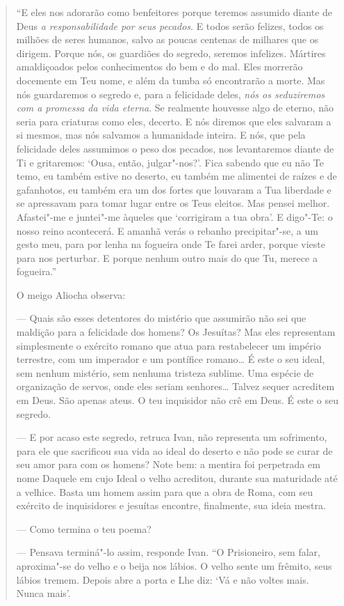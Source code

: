 \begin{quote}
``E eles nos adorarão como benfeitores porque teremos assumido diante de
Deus \emph{a responsabilidade por seus pecados}. E todos serão
felizes, todos os milhões de seres humanos, salvo as poucas centenas de
milhares que os dirigem. Porque nós, os guardiões do segredo, seremos
infelizes. Mártires amaldiçoados pelos conhecimentos do bem e do mal.
Eles morrerão docemente em Teu nome, e além da tumba só encontrarão a
morte. Mas nós guardaremos o segredo e, para a felicidade deles,
\emph{nós os seduziremos com a promessa da vida eterna}. Se realmente
houvesse algo de eterno, não seria para criaturas como eles, decerto. E
nós diremos que eles salvaram a si mesmos, mas nós salvamos a humanidade
inteira. E nós, que pela felicidade deles assumimos o peso dos pecados,
nos levantaremos diante de Ti e gritaremos: `Ousa, então,
julgar"-nos?'. Fica sabendo que eu não Te temo, eu também estive no
deserto, eu também me alimentei de raízes e de gafanhotos, eu também era
um dos fortes que louvaram a Tua liberdade e se apressavam para tomar
lugar entre os Teus eleitos. Mas pensei melhor. Afastei"-me e juntei"-me
àqueles que `corrigiram a tua obra'. E digo"-Te: o nosso reino
acontecerá. E amanhã verás o rebanho precipitar"-se, a um gesto meu, para
por lenha na fogueira onde Te farei arder, porque vieste para nos
perturbar. E porque nenhum outro mais do que Tu, merece a fogueira.''

O meigo Aliocha observa:

--- Quais são esses detentores do mistério que assumirão não sei que
maldição para a felicidade dos homens? Os Jesuítas? Mas eles representam
simplesmente o exército romano que atua para restabelecer um império
terrestre, com um imperador e um pontífice romano\ldots{} É este o seu ideal,
sem nenhum mistério, sem nenhuma tristeza sublime. Uma espécie de
organização de servos, onde eles seriam senhores\ldots{} Talvez sequer
acreditem em Deus. São apenas ateus. O teu inquisidor não crê em Deus. É este o seu
segredo.

--- E por acaso este segredo, retruca Ivan, não representa um sofrimento, para ele que
sacrificou sua vida ao ideal do deserto e não pode se curar de seu amor
para com os homens? Note bem: a mentira foi perpetrada em nome Daquele
em cujo Ideal o velho acreditou, durante sua maturidade até a velhice.
Basta um homem assim para que a obra de Roma, com seu exército de
inquisidores e jesuítas encontre, finalmente, sua ideia mestra.

--- Como termina o teu poema?

--- Pensava terminá"-lo assim, responde Ivan. ``O Prisioneiro, sem falar, aproxima"-se do
velho e o beija nos lábios. O velho sente um frêmito, seus lábios
tremem. Depois abre a porta e Lhe diz: `Vá e não voltes mais. Nunca
mais'.


\end{quote}
